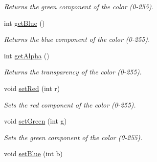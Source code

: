 \begin{DoxyCompactItemize}
\begin{DoxyCompactList}\small\item\em Returns the green component of the color (0-\/255). \end{DoxyCompactList}\item 
\hypertarget{class_picto_1_1_color_parameter_a0673c98ad2c0283a5a2897f5ac073826}{int \hyperlink{class_picto_1_1_color_parameter_a0673c98ad2c0283a5a2897f5ac073826}{get\-Blue} ()}\label{class_picto_1_1_color_parameter_a0673c98ad2c0283a5a2897f5ac073826}

\begin{DoxyCompactList}\small\item\em Returns the blue component of the color (0-\/255). \end{DoxyCompactList}\item 
\hypertarget{class_picto_1_1_color_parameter_ab794e02e826717838ca08603a8d27f33}{int \hyperlink{class_picto_1_1_color_parameter_ab794e02e826717838ca08603a8d27f33}{get\-Alpha} ()}\label{class_picto_1_1_color_parameter_ab794e02e826717838ca08603a8d27f33}

\begin{DoxyCompactList}\small\item\em Returns the transparency of the color (0-\/255). \end{DoxyCompactList}\item 
\hypertarget{class_picto_1_1_color_parameter_a1f3ec86cb6d09c5410cd6027edc3c650}{void \hyperlink{class_picto_1_1_color_parameter_a1f3ec86cb6d09c5410cd6027edc3c650}{set\-Red} (int r)}\label{class_picto_1_1_color_parameter_a1f3ec86cb6d09c5410cd6027edc3c650}

\begin{DoxyCompactList}\small\item\em Sets the red component of the color (0-\/255). \end{DoxyCompactList}\item 
\hypertarget{class_picto_1_1_color_parameter_ad2bf674317414830b8eac983ac726d8e}{void \hyperlink{class_picto_1_1_color_parameter_ad2bf674317414830b8eac983ac726d8e}{set\-Green} (int g)}\label{class_picto_1_1_color_parameter_ad2bf674317414830b8eac983ac726d8e}

\begin{DoxyCompactList}\small\item\em Sets the green component of the color (0-\/255). \end{DoxyCompactList}\item 
\hypertarget{class_picto_1_1_color_parameter_a0ba9fd9fe3ce5025a07a7ce6b92a06eb}{void \hyperlink{class_picto_1_1_color_parameter_a0ba9fd9fe3ce5025a07a7ce6b92a06eb}{set\-Blue} (int b)}\label{class_picto_1_1_color_parameter_a0ba9fd9fe3ce5025a07a7ce6b92a06eb}


\end{DoxyCompactItemize}
